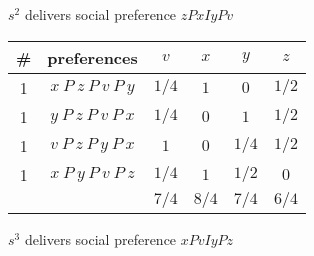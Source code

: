 \documentclass[a4paper]{article}
\begin{document}
$s^2$ delivers social preference $zPxIyPv$

\begin{table}[!htbp]
    \centering
    \begin{tabular}{c|c|cccc|}
        \# & preferences                  & $v$  & $x$  & $y$  & $z$ \\ 
        \hline
        1  & $x\: P\: z\: P\: v\: P\: y$  & $1/4$  & $1$  & $0$  & $1/2$ \\
        1  & $y\: P\: z\: P\: v\: P\: x$  & $1/4$  & $0$  & $1$  & $1/2$ \\
        1  & $v\: P\: z\: P\: y\: P\: x$  & $1$  & $0$  & $1/4$  & $1/2$ \\
        1  & $x\: P\: y\: P\: v\: P\: z$  & $1/4$  & $1$  & $1/2$  & $0$ \\
        \hline
           &                              & $7/4$ & $8/4$  & $7/4$  & $6/4$ \\
        \hline
    \end{tabular}
\end{table}

$s^3$ delivers social preference $xPvIyPz$
\end{document}
